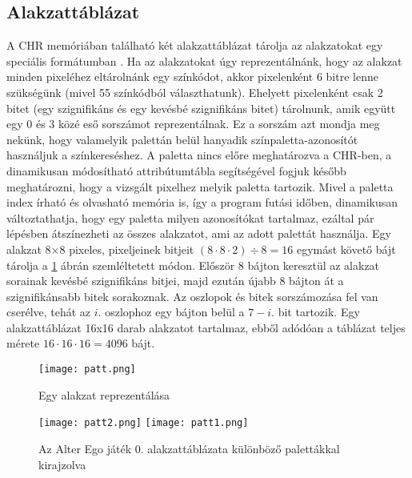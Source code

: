 \subsection{Alakzattáblázat}

A CHR memóriában található két alakzattáblázat tárolja  az alakzatokat egy speciális formátumban \cite{ppuref}. Ha az alakzatokat úgy reprezentálnánk, hogy az alakzat minden pixeléhez eltárolnánk egy színkódot, akkor pixelenként 6 bitre lenne szükségünk (mivel 55 színkódból választhatunk). Ehelyett pixelenként csak 2 bitet (egy szignifikáns és egy kevésbé szignifikáns bitet) tárolnunk, amik együtt egy 0 és 3 közé eső sorszámot reprezentálnak. Ez a sorszám azt mondja meg nekünk, hogy valamelyik palettán belül hanyadik színpaletta-azonosítót használjuk a színkereséshez. A paletta nincs előre meghatározva a CHR-ben, a dinamikusan módosítható attribútumtábla segítségével fogjuk később meghatározni, hogy a vizsgált pixelhez melyik paletta tartozik. Mivel a paletta index írható és olvasható memória is, így a program futási időben, dinamikusan változtathatja, hogy egy paletta milyen azonosítókat tartalmaz, ezáltal pár lépésben átszínezheti az összes alakzatot, ami az adott palettát használja.
Egy alakzat 8$\times$8 pixeles, pixeljeinek bitjeit $(8\cdot8\cdot2)\div8 = 16$ egymást követő bájt tárolja a \ref{fig:patt} ábrán szemléltetett módon.
Először 8 bájton keresztül az alakzat sorainak kevésbé szignifikáns bitjei, majd ezután újabb 8 bájton át a szignifikánsabb bitek sorakoznak. Az oszlopok és bitek sorszámozása fel van cserélve, tehát az $i.$ oszlophoz egy bájton belül a $7-i.$ bit tartozik.  
Egy alakzattáblázat 16x16 darab alakzatot tartalmaz, ebből adódóan a táblázat teljes mérete $16\cdot16\cdot16 = 4096$ bájt.

\begin{figure}[H]
	\centering
	\texttt{[image: patt.png]}
	\caption{Egy alakzat reprezentálása}
	\label{fig:patt}
\end{figure}


\begin{figure}[H]
	\centering
	\texttt{[image: patt2.png]}
	\hspace{5pt}
	\texttt{[image: patt1.png]}
	\caption{Az Alter Ego játék 0. alakzattáblázata különböző palettákkal kirajzolva}
\end{figure}

